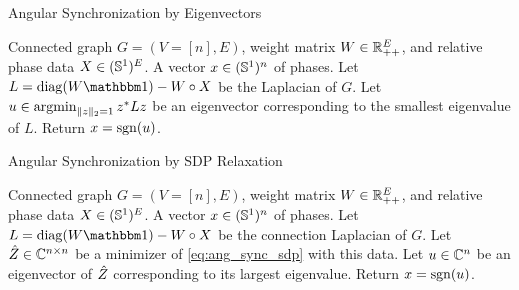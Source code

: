 \begin{algorithm}[htbp]
\renewcommand{\algorithmicrequire}{\textbf{Input:}}
\renewcommand{\algorithmicensure}{\textbf{Output:}}
\caption{Angular Synchronization by Eigenvectors}
\label{alg:ang_sync_eig}
\begin{algorithmic}[1]
  \REQUIRE Connected graph $G = (V = [n], E)$, weight matrix $W \in \mathbb{R}_{++}^E$, and relative phase data $X \in (\mathbb{S}^1)^E$.
  \ENSURE A vector $x \in (\mathbb{S}^1)^n$ of phases.
  \STATE Let $L = \diag(W \one) - W \circ X$ be the Laplacian of $G$.
  \STATE Let $u \in \operatorname*{argmin}_{\lVert z\rVert_2 = 1} z^* L z$ be an eigenvector corresponding to the smallest eigenvalue of $L$.
  \STATE Return $x = \operatorname{sgn}(u)$.
\end{algorithmic}
\end{algorithm}

\begin{algorithm}[htbp]
\renewcommand{\algorithmicrequire}{\textbf{Input:}}
\renewcommand{\algorithmicensure}{\textbf{Output:}}
\caption{Angular Synchronization by SDP Relaxation}
\label{alg:ang_sync_sdp}
\begin{algorithmic}[1]
  \REQUIRE Connected graph $G = (V = [n], E)$, weight matrix $W \in \mathbb{R}_{++}^E$, and relative phase data $X \in (\mathbb{S}^1)^E$.
  \ENSURE A vector $x \in (\mathbb{S}^1)^n$ of phases.
  \STATE Let $L = \diag(W \one) - W \circ X$ be the connection Laplacian of $G$.
  \STATE Let $\hat{Z} \in \mathbb{C}^{n \times n}$ be a minimizer of \eqref{eq:ang_sync_sdp} with this data.
  \STATE Let $u \in \mathbb{C}^n$ be an eigenvector of $\hat{Z}$ corresponding to its largest eigenvalue.
  \STATE Return $x = \operatorname{sgn}(u)$.
\end{algorithmic}
\end{algorithm}



